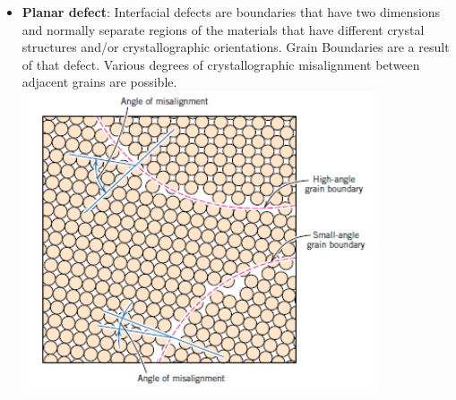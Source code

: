 \documentclass[13]{article}
\begin{document}
\begin{itemize}
\begin{itemize}
\end{itemize}
\item \textbf{Planar defect}: Interfacial defects are boundaries that have
	two dimensions and normally separate regions of the materials that
	have different crystal structures and/or crystallographic
	orientations.  Grain Boundaries are a result of that defect. Various degrees of crystallographic misalignment between adjacent grains are possible.
\\
\includegraphics[scale=0.5]{figures/5.png}
\end{itemize}
\end{document}
